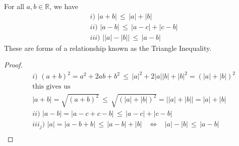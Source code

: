 \begin{recall}
For all $a, b \in \mathbb{R}$, we have
\begin{align*}
    &i) \hspace{4pt} \lvert a + b \rvert \hspace{2pt} \leq \hspace{2pt} \lvert a \rvert + \lvert b \rvert \\[2ex]
    &ii) \hspace{4pt} \lvert a - b \rvert \hspace{2pt} \leq \hspace{2pt} \lvert a - c \rvert + \lvert c - b \rvert \\[2ex]
    &iii) \hspace{4pt} \Big\lvert \lvert a \rvert - \lvert b \rvert \Big\rvert \hspace{2pt} \leq \hspace{2pt} \lvert a - b \rvert 
\end{align*}
These are forms of a relationship known as the Triangle Inequality.
\label{triangle_inequality}
\begin{proof}
    \begin{align*}
        &i) \hspace{4pt} (a + b)^{2} = a^{2} + 2ab + b^{2} \hspace{2pt} \leq \hspace{2pt} \lvert a \rvert ^{2} + 2 \lvert a \rvert \lvert b \rvert + \lvert b \rvert ^{2} = (\lvert a \rvert + \lvert b \rvert)^{2} \\[1ex]
        &\text{this gives us} \\[1ex]
        &\lvert a + b \rvert = \sqrt{(a + b)^{2}} \hspace{2pt} \leq \hspace{2pt} \sqrt{(\lvert a \rvert + \lvert b \rvert)^{2}} = \Big\lvert \lvert a \rvert + \lvert b \rvert \Big\rvert = \lvert a \rvert + \lvert b \rvert \\[6ex]
        &ii) \hspace{4pt} \lvert a - b \rvert = \lvert a - c + c - b \rvert \hspace{2pt} \leq \hspace{2pt} \lvert a - c \rvert + \lvert c - b \rvert \\[6ex]
        &iii_{j}) \hspace{4pt} \lvert a \rvert = \lvert a - b + b \rvert \hspace{2pt} \leq \hspace{2pt} \lvert a - b \rvert + \lvert b \rvert \hspace{10pt} \Longleftrightarrow \hspace{10pt} \lvert a \rvert - \lvert b \rvert \hspace{2pt} \leq \hspace{2pt} \lvert a - b \rvert \\[1ex]

\end{align*}
\end{proof}
\end{recall}
